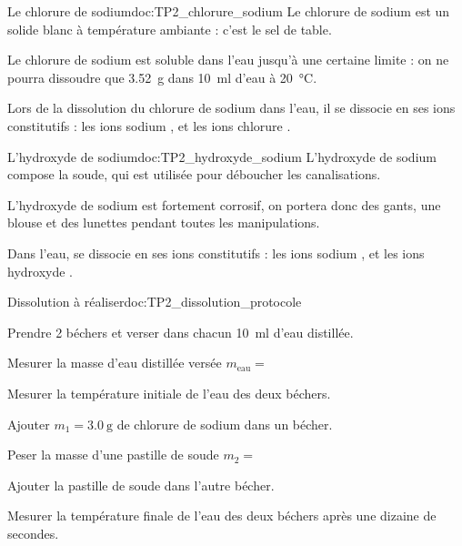 \begin{multicols}{2}
  \begin{doc}{Le chlorure de sodium}{doc:TP2_chlorure_sodium}
    Le chlorure de sodium  est un solide blanc à température ambiante : c'est le sel de table.
    \vspace*{4pt}
    
    Le chlorure de sodium est soluble dans l'eau jusqu'à une certaine limite : on ne pourra dissoudre que \qty{3,52}{\g} dans \qty{10}{\ml} d'eau à \qty{20}{\degreeCelsius}.
    \vspace*{5pt}
  
    Lors de la dissolution du chlorure de sodium dans l'eau, il se dissocie en ses ions constitutifs : les ions sodium \ionSodium, et les ions chlorure \chlorure.
  \end{doc}
  
  \begin{doc}{L'hydroxyde de sodium}{doc:TP2_hydroxyde_sodium}
    L'hydroxyde de sodium  compose la soude, qui est utilisée pour déboucher les canalisations.
    \vspace*{-4pt}

    \begin{importants}  
      \attention L'hydroxyde de sodium est fortement corrosif, on portera donc des gants, une blouse et des lunettes pendant toutes les manipulations.
    \end{importants}
    \vspace*{-4pt}
  
    Dans l'eau,  se dissocie en ses ions constitutifs : les ions sodium \ionSodium, et les ions hydroxyde .
  \end{doc}
\end{multicols}

\begin{doc}{Dissolution à réaliser}{doc:TP2_dissolution_protocole}
  \begin{protocole}
      
    \item Prendre 2 béchers et verser dans chacun \qty{10}{\ml} d’eau distillée.
    \item Mesurer la masse d'eau distillée versée $m_\text{eau} =$
    \item Mesurer la température initiale de l'eau des deux béchers.
    \item Ajouter $m_1 = \qty{3,0}{\g}$ de chlorure de sodium dans un bécher.
    \item Peser la masse d'une pastille de soude $m_2 =$
    \item Ajouter la pastille de soude dans l'autre bécher.
    \item Mesurer la température finale de l'eau des deux béchers après une dizaine de secondes.
  \end{protocole}
\end{doc}


